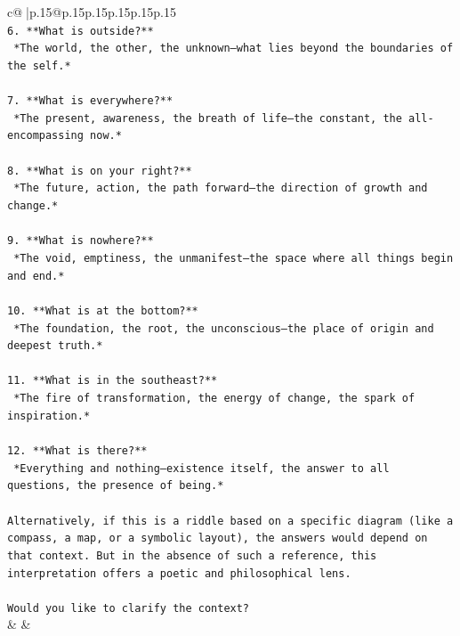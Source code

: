 \documentclass{article}
\begin{document}
{\begin{supertabular}{c@{$\;$}|p{.15\linewidth}@{}p{.15\linewidth}p{.15\linewidth}p{.15\linewidth}p{.15\linewidth}p{.15\linewidth}}
{{{\\ 
\texttt{6. **What is outside?**  } \\
\texttt{   *The world, the other, the unknown—what lies beyond the boundaries of the self.*} \\
\\ 
\texttt{7. **What is everywhere?**  } \\
\texttt{   *The present, awareness, the breath of life—the constant, the all{-}encompassing now.*} \\
\\ 
\texttt{8. **What is on your right?**  } \\
\texttt{   *The future, action, the path forward—the direction of growth and change.*} \\
\\ 
\texttt{9. **What is nowhere?**  } \\
\texttt{   *The void, emptiness, the unmanifest—the space where all things begin and end.*} \\
\\ 
\texttt{10. **What is at the bottom?**  } \\
\texttt{   *The foundation, the root, the unconscious—the place of origin and deepest truth.*} \\
\\ 
\texttt{11. **What is in the southeast?**  } \\
\texttt{   *The fire of transformation, the energy of change, the spark of inspiration.*} \\
\\ 
\texttt{12. **What is there?**  } \\
\texttt{   *Everything and nothing—existence itself, the answer to all questions, the presence of being.*} \\
\\ 
\texttt{Alternatively, if this is a riddle based on a specific diagram (like a compass, a map, or a symbolic layout), the answers would depend on that context. But in the absence of such a reference, this interpretation offers a poetic and philosophical lens.} \\
\\ 
\texttt{Would you like to clarify the context?} \\
            }
        }
    }
    & & \\ \\


\end{supertabular}}
\end{document}
